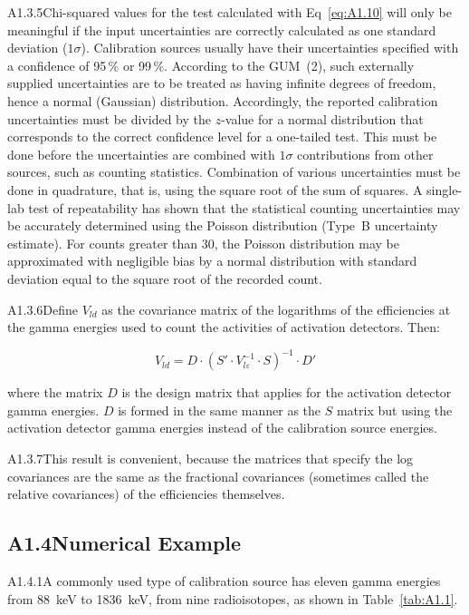 \documentclass[12pt]{article}
\begin{document}
A1.3.5\quad Chi-squared values for the test calculated with Eq~\ref{eq:A1.10} will only
be meaningful if the input uncertainties are correctly calculated as one standard
deviation ($1\sigma$). Calibration sources usually have their uncertainties specified
with a confidence of 95\,\% or 99\,\%. According to the GUM~(2), such externally
supplied uncertainties are to be treated as having infinite degrees of freedom, hence a
normal (Gaussian) distribution. Accordingly, the reported calibration uncertainties must
be divided by the $z$-value for a normal distribution that corresponds to the correct
confidence level for a one-tailed test. This must be done before the uncertainties are
combined with $1\sigma$ contributions from other sources, such as counting statistics.
Combination of various uncertainties must be done in quadrature, that is, using the
square root of the sum of squares. A single-lab test of repeatability has shown that the
statistical counting uncertainties may be accurately determined using the Poisson
distribution (Type~B uncertainty estimate). For counts greater than 30, the Poisson
distribution may be approximated with negligible bias by a normal distribution with
standard deviation equal to the square root of the recorded count.

A1.3.6\quad Define $V_{ld}$ as the covariance matrix of the logarithms of the
efficiencies at the gamma energies used to count the activities of activation detectors.
Then:

\begin{equation}
  V_{ld} = D\cdot(S'\cdot V_{l\varepsilon}^{-1}\cdot S)^{-1}\cdot D'
  \tag{A1.12}
  \label{eq:A1.12}
\end{equation}

\noindent where the matrix $D$ is the design matrix that applies for the activation
detector gamma energies. $D$ is formed in the same manner as the $S$ matrix but using
the activation detector gamma energies instead of the calibration source energies.

A1.3.7\quad This result is convenient, because the matrices that specify the log
covariances are the same as the fractional covariances (sometimes called the relative
covariances) of the efficiencies themselves.

\subsection*{A1.4\quad Numerical Example}

A1.4.1\quad A commonly used type of calibration source has eleven gamma energies from
88~keV to 1836~keV, from nine radioisotopes, as shown in Table~\ref{tab:A1.1}.
\end{document}
